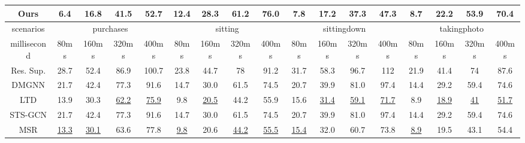 \begin{table}[h]
{\begin{tabular}{c|cccc|cccc|cccc|cccc}
    Ours   & \textbf{6.4}  & \textbf{16.8} & \textbf{41.5} & \textbf{52.7} & \textbf{12.4} & \textbf{28.3} & \textbf{61.2} & \textbf{76.0} & \textbf{7.8}  & \textbf{17.2} & \textbf{37.3} & \textbf{47.3} & \textbf{8.7} & \textbf{22.2} & \textbf{53.9} & \textbf{70.4} \\ \hline
    scenarios   & \multicolumn{4}{c|}{purchases}                                 & \multicolumn{4}{c|}{sitting}                                   & \multicolumn{4}{c|}{sittingdown}                               & \multicolumn{4}{c}{takingphoto}                              \\ \hline
    millisecond & 80ms          & 160ms         & 320ms         & 400ms         & 80ms          & 160ms         & 320ms         & 400ms         & 80ms          & 160ms         & 320ms         & 400ms         & 80ms         & 160ms         & 320ms         & 400ms         \\ \hline
    Res. Sup.   & 28.7          & 52.4          & 86.9          & 100.7         & 23.8          & 44.7          & 78            & 91.2          & 31.7          & 58.3          & 96.7          & 112           & 21.9         & 41.4          & 74            & 87.6          \\
    DMGNN & 21.7          & 42.4          & 77.3          & 91.6          & 14.7          & 30.0          & 61.5          & 74.5          & 20.7          & 39.9          & 81.0          & 97.4          & 14.4         & 29.2          & 59.4          & 74.6          \\
    LTD   & 13.9          & 30.3          & \underline{62.2}          & \underline{75.9}          & 9.8           & \underline{20.5}          & 44.2          & 55.9          & 15.6          & \underline{31.4}          & \underline{59.1}          & \underline{71.7}          & 8.9          & \underline{18.9}          & \underline{41}            & \underline{51.7}          \\
    STS-GCN & 21.7          & 42.4          & 77.3          & 91.6          & 14.7          & 30.0          & 61.5          & 74.5          & 20.7          & 39.9          & 81.0          & 97.4          & 14.4         & 29.2          & 59.4          & 74.6          \\
    MSR   & \underline{13.3}          & \underline{30.1}          & 63.6          & 77.8          & \underline{9.8}           & 20.6          & \underline{44.2}          & \underline{55.5}          & \underline{15.4}          & 32.0          & 60.7          & 73.8          & \underline{8.9}          & 19.5          & 43.1          & 54.4          \\

\end{tabular}}
\end{table}
